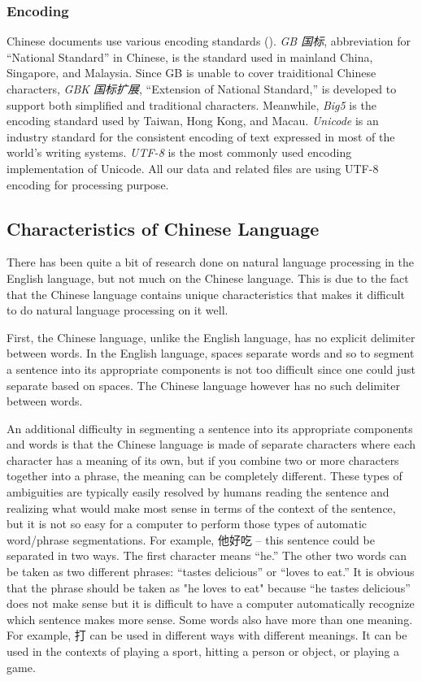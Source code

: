 \documentclass[11pt]{article}
\newcommand{\1}[1]{{\mathbf 1}\left\{#1\right\}}        %
\begin{document}
\subsubsection{Encoding}
Chinese documents use various encoding standards (\cite{wong2009introduction}). {\em GB 国标}, abbreviation for ``National Standard'' in Chinese, is the standard used in mainland China, Singapore, and Malaysia. Since GB is unable to cover traiditional Chinese characters, {\em GBK 国标扩展}, ``Extension of National Standard,'' is developed to support both simplified and traditional characters. Meanwhile, {\em Big5} is the encoding standard used by Taiwan, Hong Kong, and Macau. {\em Unicode} is an industry standard for the consistent encoding of text expressed in most of the world's writing systems. {\em UTF-8} is the most commonly used encoding implementation of Unicode. All our data and related files are using UTF-8 encoding for processing purpose.

\subsection{Characteristics of Chinese Language}\label{subsubsec:Chinese}

There has been quite a bit of research done on natural language processing in the English language, but not much on the Chinese language.  This is due to the fact that the Chinese language contains unique characteristics that makes it difficult to do natural language processing on it well. 
 
First, the Chinese language, unlike the English language, has no explicit delimiter between words. In the English language, spaces separate words and so to segment a sentence into its appropriate components is not too difficult since one could just separate based on spaces.  The Chinese language however has no such delimiter between words.
 
An additional difficulty in segmenting a sentence into its appropriate components and words is that the Chinese language is made of separate characters where each character has a meaning of its own, but if you combine two or more characters together into a phrase, the meaning can be completely different. These types of ambiguities are typically easily resolved by humans reading the sentence and realizing what would make most sense in terms of the context of the
sentence, but it is not so easy for a computer to perform those types of automatic word/phrase segmentations. For example, 他好吃 -- this sentence could be separated in two ways. The first character means ``he.'' The other two words can be taken as two different phrases: ``tastes delicious'' or ``loves to eat.''  It is obvious that the phrase should be taken as "he loves to eat" because ``he tastes delicious'' does not make sense but it is difficult to have a computer
automatically recognize which sentence makes more sense. Some words also have more than one meaning. For example, 打 can be used in different ways with different meanings. It can be used in the contexts of playing a sport, hitting a person or object, or playing a game. 
\end{document}
